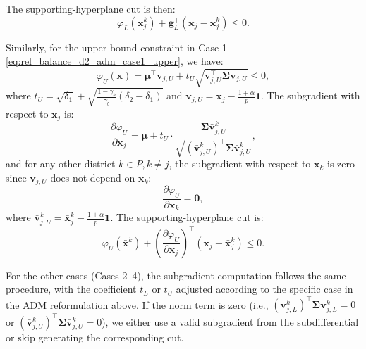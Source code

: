 \documentclass[preprint,12pt,authoryear]{elsarticle}
\begin{document}
The supporting-hyperplane cut is then:
\begin{equation}
\varphi_L(\bar{\mathbf{x}}_j^k) + \mathbf{g}_L^\top (\mathbf{x}_j - \bar{\mathbf{x}}_j^k) \leqslant 0.
\label{eq:rel_balance_d2_supporting_cut_lower}
\end{equation}

Similarly, for the upper bound constraint in Case 1 \eqref{eq:rel_balance_d2_adm_case1_upper}, we have:
\begin{equation}
\varphi_U(\mathbf{x}) = \boldsymbol{\mu}^\top \mathbf{v}_{j,U} + t_U \sqrt{\mathbf{v}_{j,U}^\top \boldsymbol{\Sigma} \mathbf{v}_{j,U}} \leqslant 0,
\end{equation}
where $t_U = \sqrt{\delta_1} + \sqrt{\frac{1 - \gamma_b}{\gamma_b} (\delta_2 - \delta_1)}$ and $\mathbf{v}_{j,U} = \mathbf{x}_j - \frac{1+\alpha}{p} \mathbf{1}$. The subgradient with respect to $\mathbf{x}_j$ is:
\begin{equation}
\frac{\partial \varphi_U}{\partial \mathbf{x}_j} = \boldsymbol{\mu} + t_U \cdot \frac{\boldsymbol{\Sigma} \bar{\mathbf{v}}_{j,U}^k}{\sqrt{(\bar{\mathbf{v}}_{j,U}^k)^{\top} \boldsymbol{\Sigma} \bar{\mathbf{v}}_{j,U}^k}},
\end{equation}
and for any other district $k \in P, k \neq j$, the subgradient with respect to $\mathbf{x}_k$ is zero since $\mathbf{v}_{j,U}$ does not depend on $\mathbf{x}_k$:
\begin{equation}
\frac{\partial \varphi_U}{\partial \mathbf{x}_k} = \mathbf{0},
\end{equation}
where $\bar{\mathbf{v}}_{j,U}^k = \bar{\mathbf{x}}_j^k - \frac{1+\alpha}{p} \mathbf{1}$. The supporting-hyperplane cut is:
\begin{equation}
\varphi_U(\bar{\mathbf{x}}^k) + \left(\frac{\partial \varphi_U}{\partial \mathbf{x}_j}\right)^\top (\mathbf{x}_j - \bar{\mathbf{x}}_j^k) \leqslant 0.
\label{eq:rel_balance_d2_supporting_cut_upper}
\end{equation}

For the other cases (Cases 2--4), the subgradient computation follows the same procedure, with the coefficient $t_L$ or $t_U$ adjusted according to the specific case in the ADM reformulation above. If the norm term is zero (i.e., $(\bar{\mathbf{v}}_{j,L}^k)^{\top} \boldsymbol{\Sigma} \bar{\mathbf{v}}_{j,L}^k = 0$ or $(\bar{\mathbf{v}}_{j,U}^k)^{\top} \boldsymbol{\Sigma} \bar{\mathbf{v}}_{j,U}^k = 0$), we either use a valid subgradient from the subdifferential or skip generating the corresponding cut.
\end{document}
